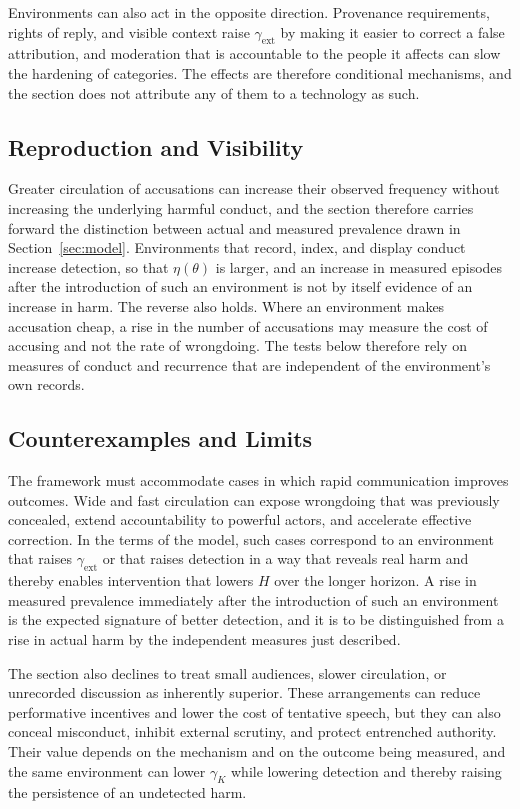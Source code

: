 \documentclass[12pt]{article}
\theoremstyle{remark}
\begin{document}
Environments can also act in the opposite direction. Provenance requirements, rights of reply, and visible context raise $\gamma_{\mathrm{ext}}$ by making it easier to correct a false attribution, and moderation that is accountable to the people it affects can slow the hardening of categories. The effects are therefore conditional mechanisms, and the section does not attribute any of them to a technology as such.

\subsection{Reproduction and Visibility}

Greater circulation of accusations can increase their observed frequency without increasing the underlying harmful conduct, and the section therefore carries forward the distinction between actual and measured prevalence drawn in Section~\ref{sec:model}. Environments that record, index, and display conduct increase detection, so that $\eta(\theta)$ is larger, and an increase in measured episodes after the introduction of such an environment is not by itself evidence of an increase in harm. The reverse also holds. Where an environment makes accusation cheap, a rise in the number of accusations may measure the cost of accusing and not the rate of wrongdoing. The tests below therefore rely on measures of conduct and recurrence that are independent of the environment's own records.

\subsection{Counterexamples and Limits}

The framework must accommodate cases in which rapid communication improves outcomes. Wide and fast circulation can expose wrongdoing that was previously concealed, extend accountability to powerful actors, and accelerate effective correction. In the terms of the model, such cases correspond to an environment that raises $\gamma_{\mathrm{ext}}$ or that raises detection in a way that reveals real harm and thereby enables intervention that lowers $H$ over the longer horizon. A rise in measured prevalence immediately after the introduction of such an environment is the expected signature of better detection, and it is to be distinguished from a rise in actual harm by the independent measures just described.

The section also declines to treat small audiences, slower circulation, or unrecorded discussion as inherently superior. These arrangements can reduce performative incentives and lower the cost of tentative speech, but they can also conceal misconduct, inhibit external scrutiny, and protect entrenched authority. Their value depends on the mechanism and on the outcome being measured, and the same environment can lower $\gamma_K$ while lowering detection and thereby raising the persistence of an undetected harm.
\end{document}
